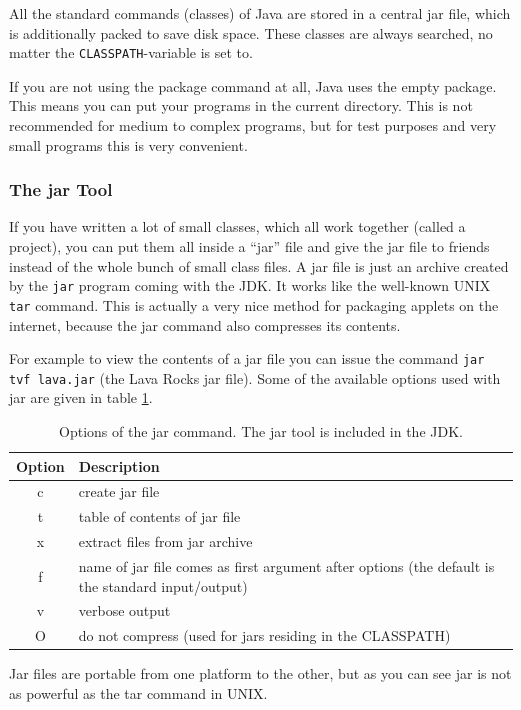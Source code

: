 All the standard commands (classes) of Java are stored in a central jar
file, which is additionally packed to save disk space. These classes
are always searched, no matter the \verb|CLASSPATH|-variable is set to.

If you are not using the package command at all, Java uses the empty 
package. This means you can put your programs in the current directory.
This is not recommended for medium to complex programs, but for
test purposes and very small programs this is very convenient.

\subsubsection{The jar Tool}
If you have written a lot of small classes, which all work together
(called a project), you
can put them all inside a ``jar'' file and give the jar file
to friends instead of the whole bunch of small class files.
A jar file is just an archive created by the \verb|jar| program 
coming with the JDK. It works like the well-known UNIX \verb|tar|
command. This is actually a very nice method for packaging
applets on the internet, because the jar command also compresses
its contents. 

For example to view the contents of a jar file you can issue the command
\verb|jar tvf lava.jar| (the Lava Rocks jar file). Some of the
available options used with jar are given in table \ref{tab:JarOptions}.
\begin{table}[htbp]
  \begin{center}
    \begin{tabular}{cp{}}
      Option & Description \\\hline
      c & create jar file\\
      t & table of contents of jar file\\
      x & extract files from jar archive\\
      f & name of jar file comes as first argument after options (the
          default is the standard input/output) \\
      v & verbose output \\
      O & do not compress (used for jars residing in the CLASSPATH)\\
    \end{tabular}
    \caption{Options of the jar command. The jar tool is included in the JDK.}
    \label{tab:JarOptions}
  \end{center}
\end{table}
Jar files are portable from one platform to the other, but as you can 
see jar is not as powerful as the tar command in UNIX.

